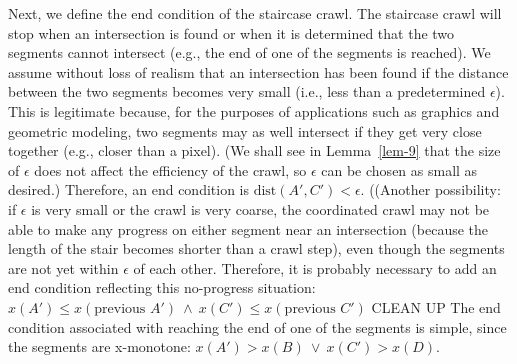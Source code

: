 Next, we define the end condition of the staircase crawl.
The staircase crawl will stop when an intersection is found or 
when it is determined that the two segments cannot intersect
(e.g., the end of one of the segments is reached).
We assume without loss of realism that an intersection has been found if
the distance between the two segments becomes very small 
(i.e., less than a predetermined $\epsilon$).
This is legitimate because, for the purposes of applications such as graphics
and geometric modeling, two segments may as well intersect 
if they get very close together (e.g., closer than a pixel).
(We shall see in Lemma~\ref{lem-9} that the size 
of $\epsilon$ does not affect the efficiency of the crawl, 
so $\epsilon$ can be chosen as small as desired.)
Therefore, an end condition is $\mbox{dist}(A',C') < \epsilon$.
\ifFull
((Another possibility: if $\epsilon$ is very small or the crawl is very coarse,
the coordinated crawl may not be able to make any progress on either segment
near an intersection
(because the length of the stair becomes shorter than a crawl step),
even though the segments are not yet within $\epsilon$ of each other.
Therefore, it is probably necessary to add an end condition reflecting this
no-progress situation: 
$x(A') \leq x(\mbox{previous }A') \ \wedge\  x(C') \leq x(\mbox{previous } C')$
CLEAN UP \fi
The end condition associated with reaching the end of one 
of the segments is simple, since the segments are x-monotone:
$x(A') > x(B) \ \vee \  x(C') > x(D)$.
%
%
%

